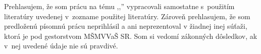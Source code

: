 %
%

Prehlasujem, že som prácu na tému ,,\nazovprace'' vypracovali samostatne
s~použitím literatúry uvedenej v~zozname použitej literatúry. Zároveň prehlasujem,
že som predloženú písomnú prácu neprihlásil a ani neprezentoval v žiadnej inej súťaži,
ktorá je pod gestorstvom MŠMVVaŠ SR. Som si vedomí zákonných dôsledkov,
ak v~nej uvedené údaje nie sú pravdivé.

